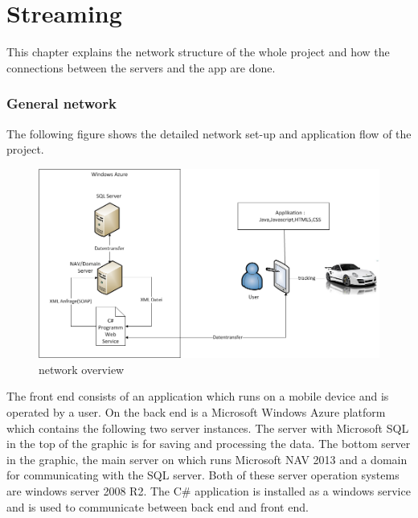 \chapter{Streaming} \label{chapter:Streaming}
This chapter explains the network structure of the whole project and how the connections between the servers and the app are done.
\subsection{General network}
The following figure shows the detailed network set-up and application flow of the project.
\begin{figure}[htbp]
\centering
\includegraphics[width=\textwidth,height=\textheight,keepaspectratio]
{graphics/networkoverview.png}
\caption{network overview}
\end{figure}

The front end consists of an application which runs on a mobile device and is operated by a user. On the back end is a Microsoft Windows Azure platform which contains the following two server instances. The server with Microsoft SQL in the top of the graphic is for saving and processing the data. The bottom server in the graphic, the main server on which runs Microsoft NAV 2013 and a domain for communicating with the SQL server. Both of these server operation systems are windows server 2008 R2. The C\# application is installed as a windows service and is used to communicate between back end and front end.


